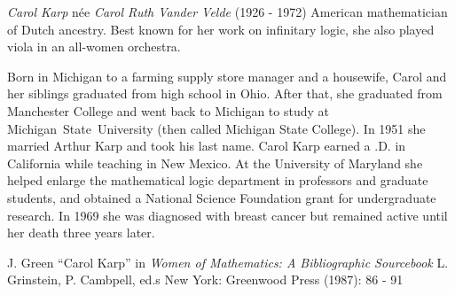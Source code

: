 \documentclass[12pt]{article}
\begin{document}
\emph{Carol Karp} n\'ee \emph{Carol Ruth Vander Velde} (1926 - 1972) American mathematician of Dutch ancestry. Best known for her work on infinitary logic, she also played viola in an all-women orchestra.

Born in Michigan to a farming supply store manager and a housewife, Carol and her siblings graduated from high school in Ohio. After that, she graduated from Manchester College and went back to Michigan to study at Michigan~State~University (then called Michigan State College). In 1951 she married Arthur Karp and took his last name. Carol Karp earned a .D. in California while teaching in New Mexico. At the University of Maryland she helped enlarge the mathematical logic department in professors and graduate students, and obtained a National Science Foundation grant for undergraduate research. In 1969 she was diagnosed with breast cancer but remained active until her death three years later.

\begin{thebibliography}{1}
 J. Green ``Carol Karp'' in {\it Women of Mathematics: A Bibliographic Sourcebook} L. Grinstein, P. Cambpell, ed.s New York: Greenwood Press (1987): 86 - 91
\end{thebibliography}
\end{document}
